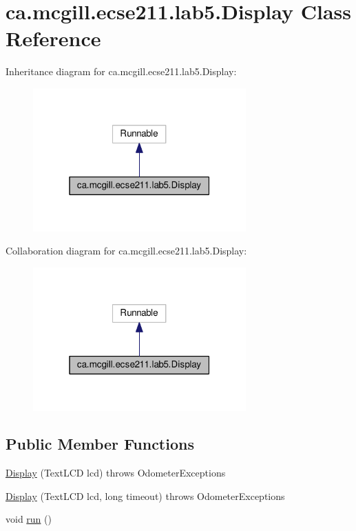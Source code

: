 \hypertarget{classca_1_1mcgill_1_1ecse211_1_1lab5_1_1_display}{}\section{ca.\+mcgill.\+ecse211.\+lab5.\+Display Class Reference}
\label{classca_1_1mcgill_1_1ecse211_1_1lab5_1_1_display}


Inheritance diagram for ca.\+mcgill.\+ecse211.\+lab5.\+Display\+:\nopagebreak
\begin{figure}[H]
\begin{center}
\leavevmode
\includegraphics[width=232pt]{classca_1_1mcgill_1_1ecse211_1_1lab5_1_1_display__inherit__graph}
\end{center}
\end{figure}


Collaboration diagram for ca.\+mcgill.\+ecse211.\+lab5.\+Display\+:\nopagebreak
\begin{figure}[H]
\begin{center}
\leavevmode
\includegraphics[width=232pt]{classca_1_1mcgill_1_1ecse211_1_1lab5_1_1_display__coll__graph}
\end{center}
\end{figure}
\subsection*{Public Member Functions}
\begin{DoxyCompactItemize}
\item 
\hyperlink{classca_1_1mcgill_1_1ecse211_1_1lab5_1_1_display_aeb15906f02c60c1ca449d4c37922739b}{Display} (Text\+L\+CD lcd)  throws Odometer\+Exceptions 
\item 
\hyperlink{classca_1_1mcgill_1_1ecse211_1_1lab5_1_1_display_abb1c01962b84cfad6ff897ce490b365a}{Display} (Text\+L\+CD lcd, long timeout)  throws Odometer\+Exceptions 
\item 
void \hyperlink{classca_1_1mcgill_1_1ecse211_1_1lab5_1_1_display_a047e885f7170ba80f60fd3b4b2bc79a9}{run} ()
\end{DoxyCompactItemize}


